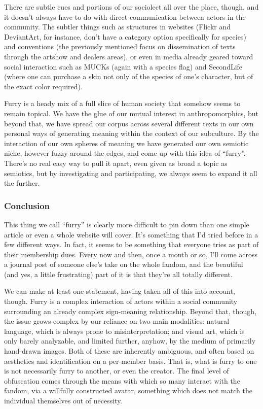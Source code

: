 There are subtle cues and portions of our sociolect all over the place,
though, and it doesn't always have to do with direct communication
between actors in the community. The subtler things such as structures
in websites (Flickr and DeviantArt, for instance, don't have a category
option specifically for species) and conventions (the previously
mentioned focus on dissemination of texts through the artshow and
dealers areas), or even in media already geared toward social
interaction such as MUCKs (again with a species flag) and SecondLife
(where one can purchase a skin not only of the species of one's
character, but of the exact color required).

Furry is a heady mix of a full slice of human society that somehow seems
to remain topical. We have the glue of our mutual interest in
anthropomorphics, but beyond that, we have spread our corpus across
several different texts in our own personal ways of generating meaning
within the context of our subculture. By the interaction of our own
spheres of meaning we have generated our own semiotic niche, however
fuzzy around the edges, and come up with this idea of ``furry''. There's
no real easy way to pull it apart, even given as broad a topic as
semiotics, but by investigating and participating, we always seem to
expand it all the further.

\subsubsection{Conclusion}\label{conclusion}

This thing we call ``furry'' is clearly more difficult to pin down than
one simple article or even a whole website will cover. It's something
that I'd tried before in a few different ways. In fact, it seems to be
something that everyone tries as part of their membership dues. Every
now and then, once a month or so, I'll come across a journal post of
someone else's take on the whole fandom, and the beautiful (and yes, a
little frustrating) part of it is that they're all totally different.

We can make at least one statement, having taken all of this into
account, though. Furry is a complex interaction of actors within a
social community surrounding an already complex sign-meaning
relationship. Beyond that, though, the issue grows complex by our
reliance on two main modalities: natural language, which is always prone
to misinterpretation; and visual art, which is only barely analyzable,
and limited further, anyhow, by the medium of primarily hand-drawn
images. Both of these are inherently ambiguous, and often based on
aesthetics and identification on a per-member basis. That is, what is
furry to one is not necessarily furry to another, or even the creator.
The final level of obfuscation comes through the means with which so
many interact with the fandom, via a willfully constructed avatar,
something which does not match the individual themselves out of
necessity.

